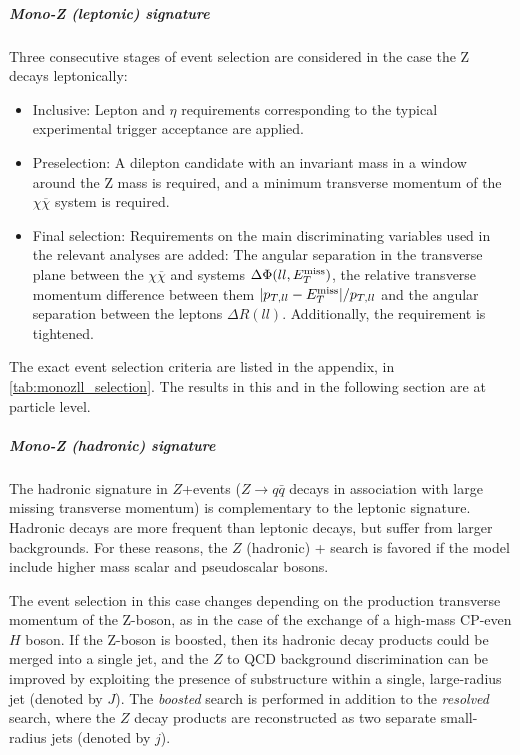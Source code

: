 \subparagraph{Mono-Z (leptonic) signature}

Three consecutive stages of event selection are considered in the case the Z decays leptonically:

\begin{itemize}
\item Inclusive: Lepton \pt and $\eta$ requirements corresponding to the typical experimental trigger acceptance are applied.
\item Preselection: A dilepton candidate with an invariant mass in a window around the Z mass is required, and a minimum transverse momentum of the $\chi\overline{\chi}$ system is required.
\item Final selection: Requirements on the main discriminating variables used in the relevant analyses are added: The angular separation in the transverse plane between the $\chi\overline{\chi}$ and \lp\lm systems $\Delta\Phi(ll,E_T^\mathrm{miss})$, the relative transverse momentum difference between them $|p_{T,ll} - E_T^\mathrm{miss}|/p_{T,ll}$ and the angular separation between the leptons $\Delta R(ll)$. Additionally, the \MET requirement is tightened.
\end{itemize}

The exact event selection criteria are listed in the appendix, in \autoref{tab:monozll_selection}. The results in this and in the following section are at particle level. 

\subparagraph{Mono-Z (hadronic) signature}

The hadronic signature in $Z$+\MET events ($Z \to q\bar{q}$ decays in association with large missing transverse momentum) is complementary to the leptonic signature. 
Hadronic decays are more frequent than leptonic decays, but suffer from larger backgrounds. For these reasons, the $Z$ (hadronic) + \MET search is favored if the model include higher mass scalar and pseudoscalar bosons. 

The event selection in this case changes depending on the production transverse momentum of the Z-boson, as in the case of the exchange of a high-mass CP-even $H$ boson. 
If the Z-boson is boosted, then its hadronic decay products could be merged into a single jet, and the $Z$ to QCD background discrimination can be improved by exploiting the presence of substructure within a single, large-radius jet (denoted by $J$). 
The \textit{boosted} search is performed in addition to the \textit{resolved} search, where the $Z$ decay products are reconstructed as two separate small-radius jets (denoted by $j$).

